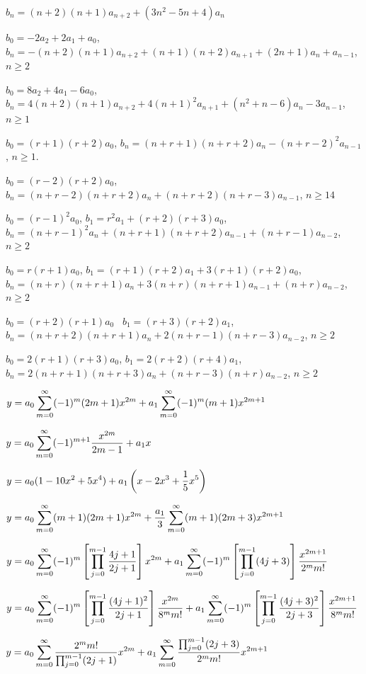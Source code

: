 $b_n=(n+2)(n+1)a_{n+2}+(3n^2-5n+4)a_n$

$b_0=-2a_2+2a_1+a_0$,
$b_n =-(n+2)(n+1)a_{n+2}+(n+1)(n+2)a_{n+1}+(2n+1)a_n
+a_{n-1}$,\;   $n\ge2$

$b_0=8a_2+4a_1-6a_0$,
$b_n=4(n+2)(n+1)a_{n+2}+4(n+1)^2a_{n+1}+(n^2+n-6)a_n-3a_{n-1}$,\;
$n\ge1$

$b_0=(r+1)(r+2)a_0$,\;
$b_n=(n+r+1)(n+r+2)a_n-(n+r-2)^2a_{n-1}$,\;       $n\ge1$.

$b_0=(r-2)(r+2)a_0$,\;
$b_n=(n+r-2)(n+r+2)a_n+(n+r+2)(n+r-3)a_{n-1}$,\;       $n\ge14$

$b_0=(r-1)^2a_0$,\;
$b_1=r^2a_1+(r+2)(r+3)a_0$,
$b_n=(n+r-1)^2a_n+(n+r+1)(n+r+2)a_{n-1}+(n+r-1)a_{n-2}$,\;
$n\ge2$

$b_0=r(r+1)a_0$,\;
$b_1=(r+1)(r+2)a_1+3(r+1)(r+2)a_0$,
$b_n=(n+r)(n+r+1)a_n+3(n+r)(n+r+1)a_{n-1}+(n+r)a_{n-2}$,\;
$n\ge2$

$b_0=(r+2)(r+1)a_0$  \,
$b_1=(r+3)(r+2)a_1$,
$b_n=(n+r+2)(n+r+1)a_n+2(n+r-1)(n+r-3)a_{n-2}$,\;
$n\ge2$

$b_0=2(r+1)(r+3)a_0$,\;
$b_1=2(r+2)(r+4)a_1$,
$b_n=2(n+r+1)(n+r+3)a_n+(n+r-3)(n+r)a_{n-2}$,\;
$n\ge2$




$y=\displaystyle{a_0\sum^\infty_{m=0}(-1)^m(2m+1)x^{2m}+
a_1\sum^\infty_{m=0}(-1)^m(m+1)x^{2m+1}}$

$y=\displaystyle{a_0\sum_{m=0}^\infty(-1)^{m+1}\frac{x^{2m}}{2m-1}+a_1x}$

$y=\displaystyle{a_0(1-10x^2+5x^4)+a_1\left(x-2x^3+\frac{1}{5}x^5\right)}$

$y=\displaystyle{a_0\sum_{m=0}^\infty(m+1)(2m+1)x^{2m}+\frac{a_1}{3}\sum_{m=0}^\infty
(m+1)(2m+3)x^{2m+1}}$

$y=\displaystyle{a_0\sum_{m=0}^\infty
(-1)^m\left[\prod_{j=0}^{m-1}\frac{4j+1}{2j+1}\right]x^{2m}
+a_1\sum_{m=0}^\infty
(-1)^m\left[\prod_{j=0}^{m-1}(4j+3)\right]\frac{x^{2m+1}}{2^mm!}}$

$y=\displaystyle{a_0\sum_{m=0}^\infty
(-1)^m\left[\prod_{j=0}^{m-1}\frac{(4j+1)^2}{2j+1}\right]\frac{x^{2m}}{8^mm!}
+a_1\sum_{m=0}^\infty
(-1)^m\left[\prod_{j=0}^{m-1}\frac{(4j+3)^2}{2j+3}\right]
\frac{x^{2m+1}}{8^mm!}}$

$y=\displaystyle{a_0\sum_{m=0}^\infty\frac{2^mm!}{\prod_{j=0}^{m-1}(2j+1)}x^{2m}
+a_1\sum_{m=0}^\infty\frac{\prod_{j=0}^{m-1}(2j+3)}{2^mm!}x^{2m+1}}$

